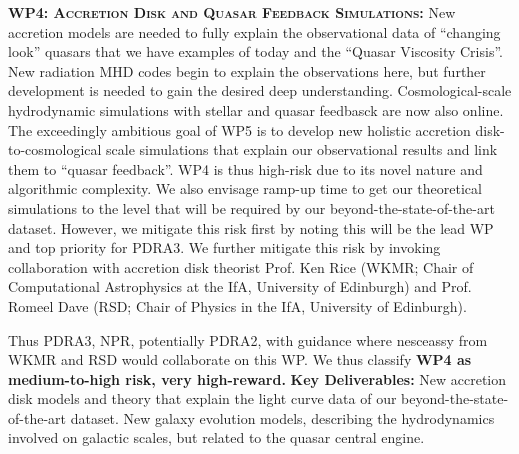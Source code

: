 \smallskip
\smallskip
\noindent
\textbf{\textsc{WP4: Accretion Disk and Quasar Feedback Simulations:}} 
New accretion models are needed to fully explain the observational
data of ``changing look'' quasars that we have examples of today and
the ``Quasar Viscosity Crisis''. New radiation MHD codes begin to
explain the observations here, but further development is needed to
gain the desired deep understanding. Cosmological-scale hydrodynamic
simulations with stellar and quasar feedbasck are now also online. The
exceedingly ambitious goal of WP5 is to develop new holistic accretion
disk-to-cosmological scale simulations that explain our observational
results and link them to ``quasar feedback''.  WP4 is thus high-risk
due to its novel nature and algorithmic complexity.  We also envisage
ramp-up time to get our theoretical simulations to the level that will
be required by our beyond-the-state-of-the-art dataset.  However, we
mitigate this risk first by noting this will be the lead WP and top
priority for PDRA3.  We further mitigate this risk by invoking
collaboration with accretion disk theorist Prof. Ken Rice (WKMR; Chair
of Computational Astrophysics at the IfA, University of Edinburgh) and
Prof. Romeel Dave (RSD; Chair of Physics in the IfA, University of
Edinburgh).

\smallskip
\smallskip
\noindent
Thus PDRA3, NPR, potentially PDRA2, with guidance where nesceassy from
WKMR and RSD would collaborate on this WP.  We thus classify {\bf WP4
as medium-to-high risk, very high-reward.}  {\bf Key Deliverables:}
New accretion disk models and theory that explain the light curve data
of our beyond-the-state-of-the-art dataset.  New galaxy evolution
models, describing the hydrodynamics involved on galactic scales, but
related to the quasar central engine.



